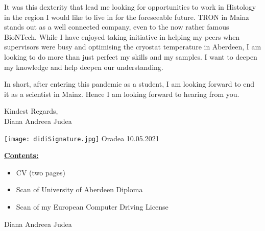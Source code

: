 \documentclass[paper=a4,fontsize=11pt]{scrartcl} %
\newcommand{\sepspace}{\vspace*{1em}}		%
\newcommand{\MyName}[1]{ %
  \Huge \usefont{OT1}{phv}{b}{n} \hfill \textcolor{titleColor}{#1}
  \par \normalsize \normalfont}
\newcommand{\MySlogan}[1]{ %
		\large \usefont{OT1}{phv}{m}{n}\hfill \textit{#1}
		\par \normalsize \normalfont}
\newcommand{\NewPart}[1]{\section*{\uppercase{{#1}}}}
\begin{document}
  \sepspace 
  \noindent It was this dexterity that lead me looking for opportunities to
  work in Histology in the region I would like to live in for the foreseeable
  future.  TRON in Mainz stands out as a well connected company, even to the
  now rather famous BioNTech.  While I have enjoyed taking initiative in
  helping my peers when supervisors were busy and optimising the cryostat
  temperature in Aberdeen, I am looking to do more than just perfect my skills
  and my samples. I want to deepen my knowledge and help deepen our
  understanding.  

  \sepspace

  \noindent In short, after entering this pandemic as a student, I am looking
  forward to end it as a scientist in Mainz.  Hence I am looking forward to
  hearing from you.
  \sepspace

  \noindent
  Kindest Regards,\\
  Diana Andreea Judea 

  \vspace{3pt}
  \hfill
  \texttt{[image: didiSignature.jpg]}\hspace{2.5cm}
  Oradea 10.05.2021

  \vspace*{\fill}
  
  \textbf{\underline{Contents:}}
  \footnotesize
  \begin{itemize}[noitemsep,topsep=0pt]
    \setlength\itemsep{1pt}
  \item CV (two pages)
    \item Scan of University of Aberdeen Diploma
    \item Scan of my European Computer Driving License
  \end{itemize}
  \normalsize
  
  \cleardoublepage
  
  \cleardoublepage
  


  \MyName{Diana Andreea Judea}

  \sepspace
\end{document}
